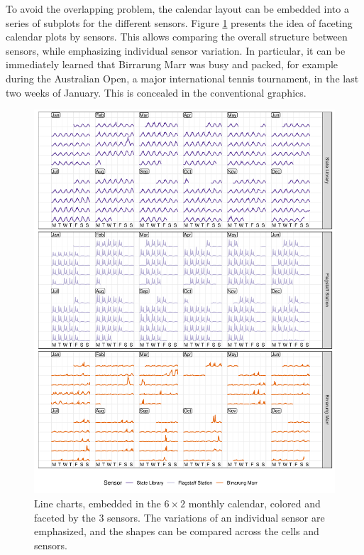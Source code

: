 \documentclass[12pt]{article}
\begin{document}
To avoid the overlapping problem, the calendar layout can be embedded into a series of subplots for the different sensors. Figure \ref{fig:facet} presents the idea of faceting calendar plots by sensors. This allows comparing the overall structure between sensors, while emphasizing individual sensor variation. In particular, it can be immediately learned that Birrarung Marr was busy and packed, for example during the Australian Open, a major international tennis tournament, in the last two weeks of January. This is concealed in the conventional graphics.

\begin{figure}

{\centering \includegraphics[width=\textwidth]{figure/facet-1} 

}

\caption{Line charts, embedded in the \(6 \times 2\) monthly calendar, colored and faceted by the 3 sensors. The variations of an individual sensor are emphasized, and the shapes can be compared across the cells and sensors.}\label{fig:facet}
\end{figure}
\end{document}
